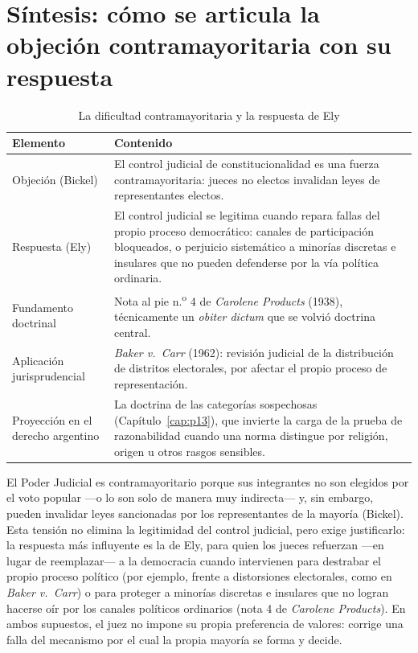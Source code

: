 \documentclass[12pt,oneside]{book}
\begin{document}
\section{Síntesis: cómo se articula la objeción contramayoritaria con su respuesta}

\begin{table}[H]
\centering
\caption{La dificultad contramayoritaria y la respuesta de Ely}
\begin{tabularx}{\textwidth}{@{}lX@{}}
\toprule
\textbf{Elemento} & \textbf{Contenido} \\
\midrule
Objeción (Bickel) & El control judicial de constitucionalidad es una fuerza
contramayoritaria: jueces no electos invalidan leyes de representantes electos. \\
Respuesta (Ely) & El control judicial se legitima cuando repara fallas del propio
proceso democrático: canales de participación bloqueados, o perjuicio
sistemático a minorías discretas e insulares que no pueden defenderse por la vía
política ordinaria. \\
Fundamento doctrinal & Nota al pie n.\textsuperscript{o} 4 de \textit{Carolene
Products} (1938), técnicamente un \textit{obiter dictum} que se volvió
doctrina central. \\
Aplicación jurisprudencial & \textit{Baker v.\ Carr} (1962): revisión judicial de
la distribución de distritos electorales, por afectar el propio proceso de
representación. \\
Proyección en el derecho argentino & La doctrina de las categorías sospechosas
(Capítulo~\ref{cap:p13}), que invierte la carga de la prueba de razonabilidad
cuando una norma distingue por religión, origen u otros rasgos sensibles. \\
\bottomrule
\end{tabularx}
\end{table}

\begin{exambox}
El Poder Judicial es contramayoritario porque sus integrantes no son elegidos
por el voto popular —o lo son solo de manera muy indirecta— y, sin embargo, pueden
invalidar leyes sancionadas por los representantes de la mayoría (Bickel). Esta
tensión no elimina la legitimidad del control judicial, pero exige justificarlo:
la respuesta más influyente es la de Ely, para quien los jueces refuerzan —en
lugar de reemplazar— a la democracia cuando intervienen para destrabar el propio
proceso político (por ejemplo, frente a distorsiones electorales, como en
\textit{Baker v.\ Carr}) o para proteger a minorías discretas e insulares que no
logran hacerse oír por los canales políticos ordinarios (nota 4 de
\textit{Carolene Products}). En ambos supuestos, el juez no impone su propia
preferencia de valores: corrige una falla del mecanismo por el cual la propia
mayoría se forma y decide.
\end{exambox}
\end{document}

